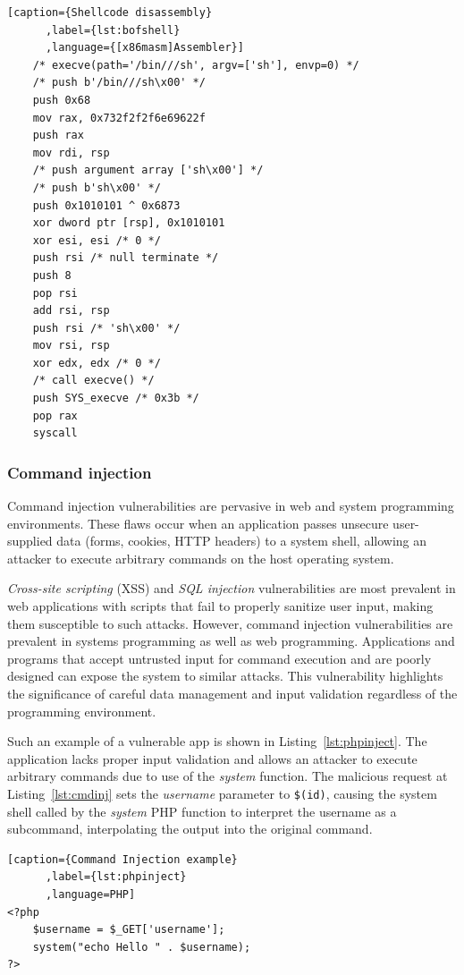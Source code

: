 \documentclass{article}
\begin{document}
\begin{lstlisting}[caption={Shellcode disassembly}
      ,label={lst:bofshell}
      ,language={[x86masm]Assembler}]
    /* execve(path='/bin///sh', argv=['sh'], envp=0) */
    /* push b'/bin///sh\x00' */
    push 0x68
    mov rax, 0x732f2f2f6e69622f
    push rax
    mov rdi, rsp
    /* push argument array ['sh\x00'] */
    /* push b'sh\x00' */
    push 0x1010101 ^ 0x6873
    xor dword ptr [rsp], 0x1010101
    xor esi, esi /* 0 */
    push rsi /* null terminate */
    push 8
    pop rsi
    add rsi, rsp
    push rsi /* 'sh\x00' */
    mov rsi, rsp
    xor edx, edx /* 0 */
    /* call execve() */
    push SYS_execve /* 0x3b */
    pop rax
    syscall
\end{lstlisting}

\subsubsection{Command injection}
Command injection vulnerabilities are pervasive in web and system programming environments. These flaws occur when an application passes unsecure user-supplied data (forms, cookies, HTTP headers) to a system shell, allowing an attacker to execute arbitrary commands on the host operating system.

\emph{Cross-site scripting} (XSS) and \emph{SQL injection} vulnerabilities are most prevalent in web applications with scripts that fail to properly sanitize user input, making them susceptible to such attacks.
However, command injection vulnerabilities are prevalent in systems programming as well as web programming. Applications and programs that accept untrusted input for command execution and are poorly designed can expose the system to similar attacks. This vulnerability highlights the significance of careful data management and input validation regardless of the programming environment.

Such an example of a vulnerable app is shown in Listing~\ref{lst:phpinject}. The application lacks proper input validation and allows an attacker to execute arbitrary commands due to use of the \emph{system} function. The malicious request at Listing~\ref{lst:cmdinj} sets the \emph{username} parameter to \verb|$(id)|, causing the system shell called by the \emph{system} PHP function to interpret the username as a subcommand, interpolating the output into the original command.

\begin{minipage}{\linewidth}
\begin{lstlisting}[caption={Command Injection example}
      ,label={lst:phpinject}
      ,language=PHP]
<?php
    $username = $_GET['username'];
    system("echo Hello " . $username);
?>
\end{lstlisting}
\end{minipage}
\end{document}
